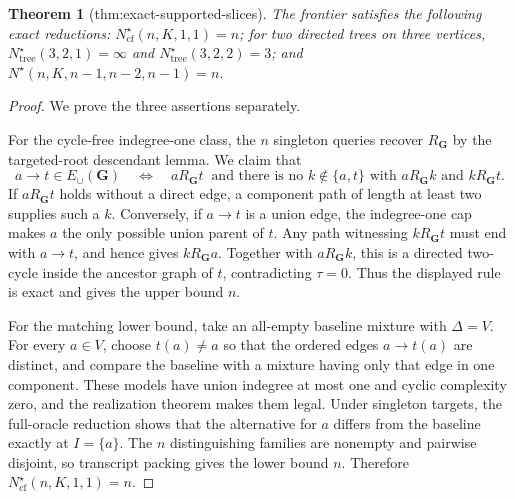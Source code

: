 \documentclass{article}
\newtheorem{theorem}{Theorem}
\begin{document}
\begin{theorem}[thm:exact-supported-slices]\label{thm:exact-supported-slices}
The frontier satisfies the following exact reductions: \(N^{\star}_{\mathrm{cf}}(n,K,1,1)=n\); for two directed trees on three vertices, \(N^{\star}_{\mathrm{tree}}(3,2,1)=\infty\) and \(N^{\star}_{\mathrm{tree}}(3,2,2)=3\); and \(N^{\star}(n,K,n-1,n-2,n-1)=n\).
\end{theorem}
\begin{proof}
We prove the three assertions separately.

For the cycle-free indegree-one class, the \(n\) singleton queries recover \(R_{\mathbf G}\) by the targeted-root descendant lemma. We claim that
\[
 a\to t\in E_{\cup}(\mathbf G)
 \quad\Longleftrightarrow\quad
 aR_{\mathbf G}t\ \text{ and there is no }k\notin\{a,t\}
 \text{ with }aR_{\mathbf G}k\text{ and }kR_{\mathbf G}t.
\]
If \(aR_{\mathbf G}t\) holds without a direct edge, a component path of length at least two supplies such a \(k\). Conversely, if \(a\to t\) is a union edge, the indegree-one cap makes \(a\) the only possible union parent of \(t\). Any path witnessing \(kR_{\mathbf G}t\) must end with \(a\to t\), and hence gives \(kR_{\mathbf G}a\). Together with \(aR_{\mathbf G}k\), this is a directed two-cycle inside the ancestor graph of \(t\), contradicting \(\tau=0\). Thus the displayed rule is exact and gives the upper bound \(n\).

For the matching lower bound, take an all-empty baseline mixture with \(\Delta=V\). For every \(a\in V\), choose \(t(a)\ne a\) so that the ordered edges \(a\to t(a)\) are distinct, and compare the baseline with a mixture having only that edge in one component. These models have union indegree at most one and cyclic complexity zero, and the realization theorem makes them legal. Under singleton targets, the full-oracle reduction shows that the alternative for \(a\) differs from the baseline exactly at \(I=\{a\}\). The \(n\) distinguishing families are nonempty and pairwise disjoint, so transcript packing gives the lower bound \(n\). Therefore \(N^{\star}_{\mathrm{cf}}(n,K,1,1)=n\).


\end{proof}
\end{document}
